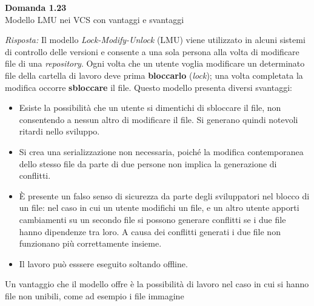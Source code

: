 \documentclass{article}
\newenvironment{problem}[2][Domanda]
    { \begin{mdframed}[backgroundcolor=gray!20] \textbf{#1 #2} \\}
    {  \end{mdframed}}
\newenvironment{solution}
    {\textit{Risposta:}}
    {}
\begin{document}
\begin{problem}{1.23}
Modello LMU nei VCS con vantaggi e svantaggi
\end{problem}
\begin{solution}
Il modello \textit{Lock-Modify-Unlock} (LMU) viene utilizzato in alcuni sistemi di controllo delle versioni e consente a una sola persona alla volta di modificare file di una \textit{repository}.
Ogni volta che un utente voglia modificare un determinato file della cartella di lavoro deve prima \textbf{bloccarlo} (\textit{lock}); una volta completata la modifica occorre \textbf{sbloccare} il file.
Questo modello presenta diversi svantaggi:
\begin{itemize}
	\item Esiste la possibilità che un utente si dimentichi di sbloccare il file, non consentendo a nessun altro di modificare il file.
	\newline
	Si generano quindi notevoli ritardi nello sviluppo.
	\item Si crea una serializzazione non necessaria, poiché la modifica contemporanea dello stesso file da parte di due persone non implica la generazione di conflitti.
	\item È presente un falso senso di sicurezza da parte degli sviluppatori nel blocco di un file: nel caso in cui un utente modifichi un file, e un altro utente apporti cambiamenti su un secondo file si possono generare conflitti se i due file hanno dipendenze tra loro.
	\newline
	A causa dei conflitti generati i due file non funzionano più correttamente insieme.
	\item Il lavoro può esssere eseguito soltando offline.
\end{itemize}
Un vantaggio che il modello offre è la possibilità di lavoro nel caso in cui si hanno file non unibili, come ad esempio i file immagine
\end{solution}
\end{document}
